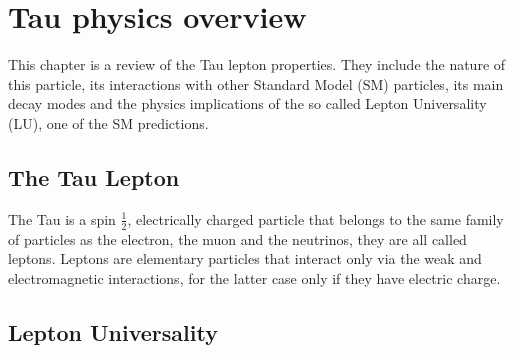 \chapter{Tau physics overview}\label{chap:relatedwork}
This chapter is a review of the Tau lepton properties. They include the nature of this particle, its interactions with other Standard Model (SM) particles, its main decay modes and the physics implications of the so called Lepton Universality (LU), one of the SM predictions.  

\section{The Tau Lepton}
The Tau is a spin $\frac{1}{2}$, electrically charged particle that belongs to the same family of particles as the electron, the muon and the neutrinos, they are all called leptons. Leptons are elementary particles that interact only via the weak and electromagnetic interactions, for the latter case only if they have electric charge.  

	
\section{Lepton Universality}



